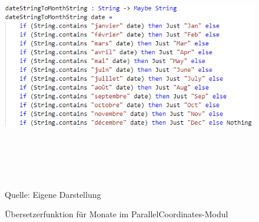\documentclass[usegeometry=true]{scrartcl}
\begin{document}
\begin{figure}[]
\begin{center}
\includegraphics[width=12cm,height=10cm,keepaspectratio]{monthTranslator.PNG}%
\caption{Übersetzerfunktion für Monate im ParallelCoordinates-Modul}
Quelle: Eigene Darstellung
\label{monthTranslator}
\end{center}
\end{figure}
\end{document}
